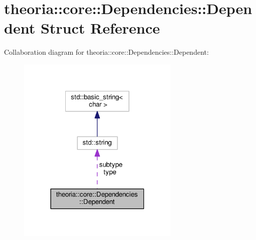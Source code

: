 \hypertarget{structtheoria_1_1core_1_1Dependencies_1_1Dependent}{}\section{theoria\+:\+:core\+:\+:Dependencies\+:\+:Dependent Struct Reference}
\label{structtheoria_1_1core_1_1Dependencies_1_1Dependent}


Collaboration diagram for theoria\+:\+:core\+:\+:Dependencies\+:\+:Dependent\+:\nopagebreak
\begin{figure}[H]
\begin{center}
\leavevmode
\includegraphics[width=219pt]{structtheoria_1_1core_1_1Dependencies_1_1Dependent__coll__graph}
\end{center}
\end{figure}
